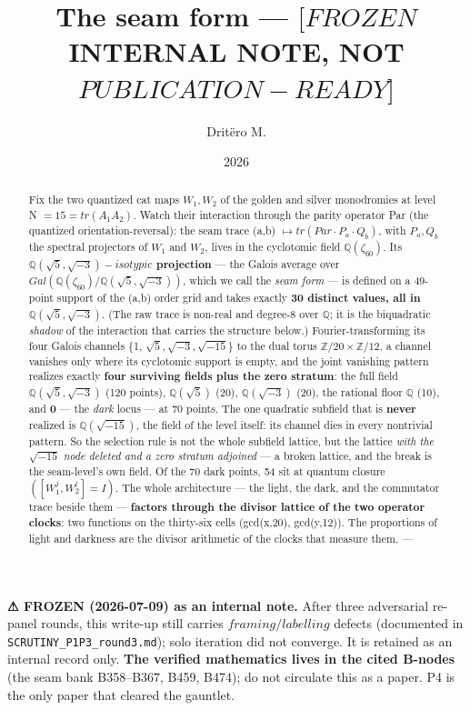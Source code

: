 \documentclass[11pt]{article}
\title{The seam form — \([FROZEN\) INTERNAL NOTE, NOT \(PUBLICATION-READY]\)}
\author{Dritëro M.}
\date{2026}
\theoremstyle{plain}
\theoremstyle{definition}
\theoremstyle{remark}
\begin{document}
\maketitle
\begin{abstract}
Fix the two quantized cat maps \(W_{1}, W_{2}\) of the golden and silver monodromies at level N \(= 15 = tr(A_{1}A_{2})\). Watch their interaction through the parity operator Par (the quantized orientation-reversal): the seam trace (a,b) \(\mapsto  tr(Par\cdot P_{a}\cdot Q_{b})\), with \(P_{a}, Q_{b}\) the spectral projectors of \(W_{1}\) and \(W_{2}\), lives in the cyclotomic field \(\mathbb{Q}(\zeta _{60})\). Its \textbf{\(\mathbb{Q}(\sqrt{5},\sqrt{-3})-isotypic\) projection} — the Galois average over \(Gal(\mathbb{Q}(\zeta _{60})/\mathbb{Q}(\sqrt{5},\sqrt{-3}))\), which we call the \emph{seam form} — is defined on a 49-point support of the (a,b) order grid and takes exactly \textbf{30 distinct values, all in \(\mathbb{Q}(\sqrt{5}, \sqrt{-3})\)}. (The raw trace is non-real and degree-8 over \(\mathbb{Q}\); it is the biquadratic \emph{shadow} of the interaction that carries the structure below.) Fourier-transforming its four Galois channels \{1, \(\sqrt{5}, \sqrt{-3}, \sqrt{-15}\}\) to the dual torus \(\mathbb{Z}/20 \times  \mathbb{Z}/12\), a channel vanishes only where its cyclotomic support is empty, and the joint vanishing pattern realizes exactly \textbf{four surviving fields plus the zero stratum}: the full field \(\mathbb{Q}(\sqrt{5},\sqrt{-3})\) (120 points), \(\mathbb{Q}(\sqrt{5})\) (20), \(\mathbb{Q}(\sqrt{-3})\) (20), the rational floor \(\mathbb{Q}\) (10), and \textbf{0} — the \emph{dark} locus — at 70 points. The one quadratic subfield that is \textbf{never} realized is \(\mathbb{Q}(\sqrt{-15})\), the field of the level itself: its channel dies in every nontrivial pattern. So the selection rule is not the whole subfield lattice, but the lattice \emph{with the \(\sqrt{-15}\) node deleted and a zero stratum adjoined} — a broken lattice, and the break is the seam-level's own field. Of the 70 dark points, 54 sit at quantum closure \(([W_{1}^{j},W_{2}^{l}]=I)\). The whole architecture — the light, the dark, and the commutator trace beside them — \textbf{factors through the divisor lattice of the two operator clocks}: two functions on the thirty-six cells (gcd(x,20), gcd(y,12)). The proportions of light and darkness are the divisor arithmetic of the clocks that measure them.  ---
\end{abstract}
\textbf{⚠ FROZEN (2026-07-09) as an internal note.} After three adversarial re-panel rounds, this write-up still carries \(framing/labelling\) defects (documented in \texttt{SCRUTINY\_P1P3\_round3.md}); solo iteration did not converge. It is retained as an internal record only. \textbf{The verified mathematics lives in the cited B-nodes} (the seam bank B358–B367, B459, B474); do not circulate this as a paper. P4 is the only paper that cleared the gauntlet.
\end{document}

